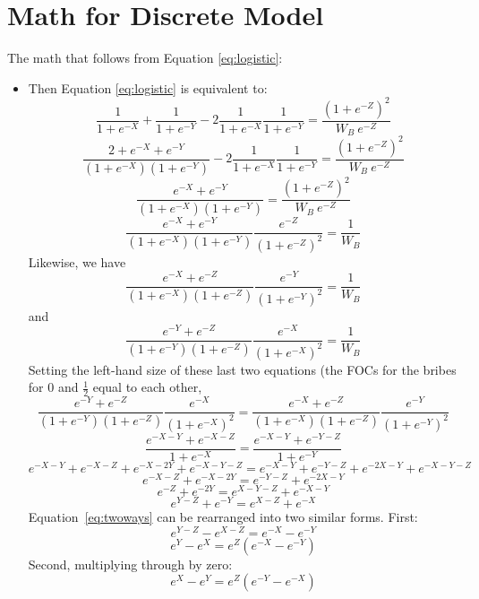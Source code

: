 \documentclass[12pt]{article}
\begin{document}
\section{Math for Discrete Model}
The math that follows from Equation \ref{eq:logistic}:
\begin{itemize}
	\item Then Equation \ref{eq:logistic} is equivalent to:
		\begin{equation}
			\frac{1}{1+e^{-X}} + \frac{1}{1+e^{-Y}} - 2\frac{1}{1+e^{-X}}  \frac{1}{1+e^{-Y}} = \frac{\left(1+e^{-Z}\right)^2}{W_B \: e^{-Z} }
					\label{eq:logistic2}
		\end{equation}
		\[
			\frac{2 + e^{-X} + e^{-Y}}{\left(1+e^{-X}\right)\left(1+e^{-Y}\right)} - 2\frac{1}{1+e^{-X}}  \frac{1}{1+e^{-Y}} = \frac{\left(1+e^{-Z}\right)^2}{W_B \: e^{-Z}}
		\]
		\[
			\frac{e^{-X} + e^{-Y}}{\left(1+e^{-X}\right)\left(1+e^{-Y}\right)} = \frac{\left(1+e^{-Z}\right)^2}{W_B \: e^{-Z}}
		\]
		\begin{equation}
			\frac{e^{-X} + e^{-Y}}{\left(1+e^{-X}\right)\left(1+e^{-Y}\right)} \frac{e^{-Z}}{\left(1+e^{-Z}\right)^2}= \frac{1}{W_B}
		\end{equation}
		Likewise, we have
		\begin{equation}
			\frac{e^{-X} + e^{-Z}}{\left(1+e^{-X}\right)\left(1+e^{-Z}\right)} \frac{e^{-Y}}{\left(1+e^{-Y}\right)^2}= \frac{1}{W_B}
		\end{equation}
		and
		\begin{equation}
			\frac{e^{-Y} + e^{-Z}}{\left(1+e^{-Y}\right)\left(1+e^{-Z}\right)} \frac{e^{-X}}{\left(1+e^{-X}\right)^2}= \frac{1}{W_B}
			\label{eq:base}
		\end{equation}
		Setting the left-hand size of these last two equations (the FOCs for the bribes for 0 and $\frac{1}{2}$ equal to each other,
		\[
		  \frac{e^{-Y} + e^{-Z}}{\left(1+e^{-Y}\right)\left(1+e^{-Z}\right)} \frac{e^{-X}}{\left(1+e^{-X}\right)^2}= \frac{e^{-X} + e^{-Z}}{\left(1+e^{-X}\right)\left(1+e^{-Z}\right)} \frac{e^{-Y}}{\left(1+e^{-Y}\right)^2}
		\]
		\[
		  \frac{e^{-X-Y} + e^{-X-Z}}{1+e^{-X}}= \frac{e^{-X-Y} + e^{-Y-Z}}{1+e^{-Y}}
		\]
		\[
		  e^{-X-Y} + e^{-X-Z} + e^{-X-2Y} +e^{-X-Y-Z}= e^{-X-Y} + e^{-Y-Z} + e^{-2X-Y} +e^{-X-Y-Z}
		\]
		\[
		  e^{-X-Z} +e^{-X-2Y}= e^{-Y-Z} +e^{-2X-Y}
		\]
		\[
		  e^{-Z} +e^{-2Y}= e^{X-Y-Z} +e^{-X-Y}
		\]
		\begin{equation}
		  e^{Y-Z} +e^{-Y}= e^{X-Z} +e^{-X}
			\label{eq:twoways}
		\end{equation}
   Equation~\ref{eq:twoways} can be rearranged into two similar forms. First:
		\[
		  e^{Y-Z} - e^{X-Z}= e^{-X} - e^{-Y}
		\]
		\begin{equation}
		  e^{Y} - e^{X}= e^Z\left(e^{-X} - e^{-Y}\right)
			\label{eq:1}
		\end{equation}
  	Second, multiplying through by zero:
	  \begin{equation}
		  e^{X} - e^{Y}= e^Z\left(e^{-Y} - e^{-X}\right)
			\label{eq:2}
		\end{equation}
	\end{itemize}	
\end{document}
